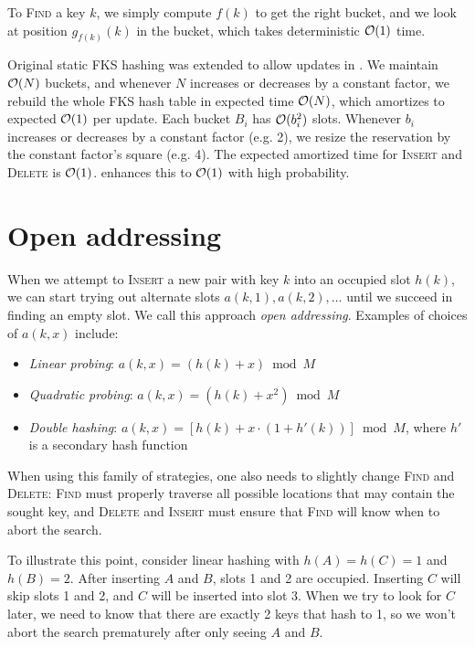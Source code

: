 To \textsc{Find} a key $k$, we simply compute $f(k)$ to get the right bucket,
and we look at position $g_{f(k)}(k)$ in the bucket, which takes deterministic
$\mathcal{O}(1)$ time.

Original static FKS hashing was extended to allow updates in
\cite{dyn-ph-bounds}.
We maintain $\mathcal{O}(N)$ buckets, and whenever $N$ increases or decreases by
a constant factor, we rebuild the whole FKS hash table in expected time
$\mathcal{O}(N)$, which amortizes to expected $\mathcal{O}(1)$ per update. Each bucket $B_i$
has $\mathcal{O}(b_i^2)$ slots. Whenever $b_i$ increases or decreases by a constant
factor (e.g. 2), we resize the reservation by the constant factor's square
(e.g. 4).
The expected amortized time for \textsc{Insert} and \textsc{Delete} is $\mathcal{O}(1)$.
\cite{univ-class-of-hfns} enhances this to $\mathcal{O}(1)$ with high probability.

\section{Open addressing}
\label{sec:open-addressing}
When we attempt to \textsc{Insert} a new pair with key $k$ into an occupied slot
$h(k)$, we can start trying out alternate slots $a(k,1), a(k,2), \ldots$
until we succeed in finding an empty slot. We call this approach \emph{open
addressing}. Examples of choices of $a(k,x)$ include:
\begin{itemize}
\item \emph{Linear probing}: $a(k,x)=(h(k)+x) \bmod M$
\item \emph{Quadratic probing}: $a(k,x)=(h(k)+x^2) \bmod M$
\item \emph{Double hashing}: $a(k,x)=[h(k)+x\cdot (1+h'(k))]\bmod M$, where
$h'$ is a secondary hash function
\end{itemize}

When using this family of strategies, one also needs to slightly change
\textsc{Find} and \textsc{Delete}: \textsc{Find} must properly traverse
all possible locations that may contain the sought key, and \textsc{Delete}
and \textsc{Insert} must ensure that \textsc{Find} will know when to abort
the search.

To illustrate this point, consider linear hashing with $h(A)=h(C)=1$ and
$h(B)=2$. After inserting $A$ and $B$, slots 1 and 2 are occupied.
Inserting $C$ will skip slots 1 and 2, and $C$ will be inserted into slot 3.
When we try to look for $C$ later, we need to know that there are exactly 2 keys
that hash to 1, so we won't abort the search prematurely after only seeing
$A$ and $B$.

